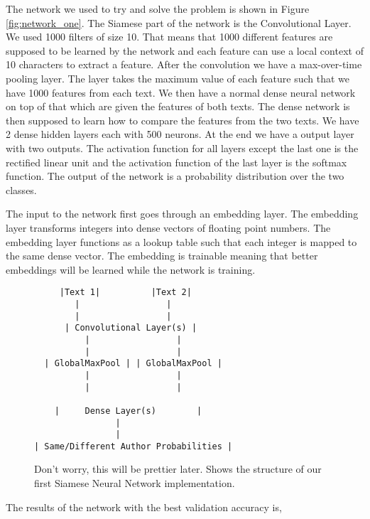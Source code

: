 The network we used to try and solve the problem is shown in Figure
\ref{fig:network_one}. The Siamese part of the network is the Convolutional
Layer. We used 1000 filters of size 10. That means that 1000 different features
are supposed to be learned by the network and each feature can use a local
context of 10 characters to extract a feature. After the convolution we have a
max-over-time pooling layer. The layer takes the maximum value of each feature
such that we have 1000 features from each text. We then have a normal dense
neural network on top of that which are given the features of both texts. The
dense network is then supposed to learn how to compare the features from the
two texts. We have 2 dense hidden layers each with 500 neurons. At the end we
have a output layer with two outputs. The activation function for all layers
except the last one is the rectified linear unit and the activation function of
the last layer is the softmax function. The output of the network is a
probability distribution over the two classes.

The input to the network first goes through an embedding layer. The embedding
layer transforms integers into dense vectors of floating point numbers. The
embedding layer functions as a lookup table such that each integer is mapped
to the same dense vector. The embedding is trainable meaning that better
embeddings will be learned while the network is training.

\begin{figure}[htb]
\begin{lstlisting}
     |Text 1|          |Text 2|
        |                 |
        |                 |
      | Convolutional Layer(s) |
          |                 |
          |                 |
  | GlobalMaxPool | | GlobalMaxPool |
          |                 |
          |                 |

    |     Dense Layer(s)        |
                |
                |
| Same/Different Author Probabilities |
\end{lstlisting}
\caption{Don't worry, this will be prettier later. Shows the structure of our
    first Siamese Neural Network implementation.}
\end{figure}

The results of the network with the best validation accuracy is,
